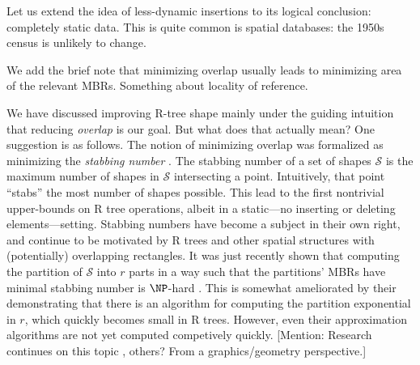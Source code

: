 Let us extend the idea of less-dynamic insertions to its logical conclusion: completely static data.
This is quite common is spatial databases: the 1950s census is unlikely to change.

We add the brief note that minimizing overlap usually leads to minimizing area of the relevant MBRs.
Something about locality of reference.

We have discussed improving R-tree shape mainly under the guiding intuition that reducing \emph{overlap} is our goal.
But what does that actually mean?
One suggestion is as follows.
The notion of minimizing overlap was formalized as minimizing the \emph{stabbing number} \cite{berggudmundssonhammarovermars00}.
The stabbing number of a set of shapes $\mathcal S$ is the maximum number of shapes in $\mathcal S$ intersecting a point.
Intuitively, that point ``stabs'' the most number of shapes possible.
This lead to the first nontrivial upper-bounds on R tree operations, albeit in a static---no inserting or deleting elements---setting.
Stabbing numbers have become a subject in their own right, and continue to be motivated by R trees and other spatial structures with (potentially) overlapping rectangles.
It was just recently shown that computing the partition of $\mathcal S$ into $r$ parts in a way such that the partitions' MBRs have minimal stabbing number is $\NP$-hard \cite{bergkhosraviverdonschotweele11}.
This is somewhat ameliorated by their demonstrating that there is an algorithm for computing the partition exponential in $r$, which quickly becomes small in R trees.
However, even their approximation algorithms are not yet computed competively quickly.
[Mention: Research continues on this topic \cite{durochermehrabi12}, others? From a graphics/geometry perspective.]


